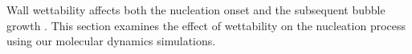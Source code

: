 Wall wettability affects both the nucleation onset and the subsequent bubble growth \cite{kim2015,chen2019}. This section examines the effect of wettability on the nucleation process using our molecular dynamics simulations.